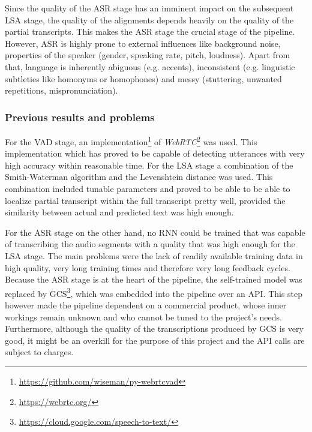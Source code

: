 Since the quality of the \ac{ASR} stage has an imminent impact on the subsequent \ac{LSA} stage, the quality of the alignments depends heavily on the quality of the partial transcripts. This makes the \ac{ASR} stage the crucial stage of the pipeline. However, \ac{ASR} is highly prone to external influences like background noise, properties of the speaker (gender, speaking rate, pitch, loudness). Apart from that, language is inherently abiguous (e.g. accents), inconsistent (e.g. linguistic subtleties like homonyms or homophones) and messy (stuttering, unwanted repetitions, mispronunciation).

\subsubsection{Previous results and problems}
For the \ac{VAD} stage, an implementation\footnote{\url{https://github.com/wiseman/py-webrtcvad}} of \textit{WebRTC}\footnote{\url{https://webrtc.org/}} was used. This implementation which has proved to be capable of detecting utterances with very high accuracy within reasonable time. For the \ac{LSA} stage a combination of the Smith-Waterman algorithm and the Levenshtein distance was used. This combination included tunable parameters and proved to be able to be able to localize partial transcript within the full transcript pretty well, provided the similarity between actual and predicted text was high enough. 

For the \ac{ASR} stage on the other hand, no \ac{RNN} could be trained that was capable of transcribing the audio segments with a quality that was high enough for the \ac{LSA} stage. The main problems were the lack of readily available training data in high quality, very long training times and therefore very long feedback cycles. Because the \ac{ASR} stage is at the heart of the pipeline, the self-trained model was replaced by \ac{GCS}\footnote{\url{https://cloud.google.com/speech-to-text/}}, which was embedded into the pipeline over an API. This step however made the pipeline dependent on a commercial product, whose inner workings remain unknown and who cannot be tuned to the project's needs. Furthermore, although the quality of the transcriptions produced by \ac{GCS} is very good, it might be an overkill for the purpose of this project and the API calls are subject to charges.

